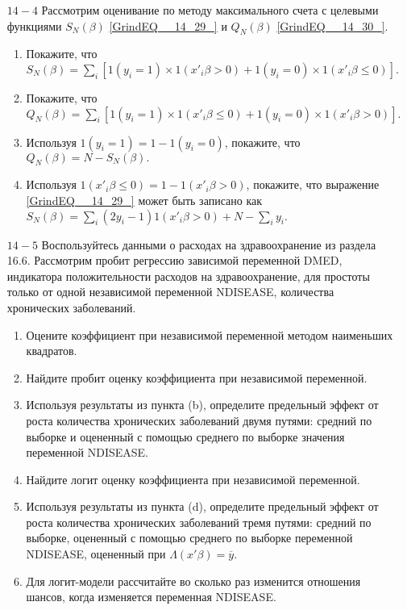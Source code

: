 \begin{enumerate}
\item [$14 - 4$] Рассмотрим оценивание по методу максимального счета с целевыми функциями $S_N(\beta)$ \eqref{GrindEQ__14_29_} и $Q_N(\beta)$ \eqref{GrindEQ__14_30_}.
\begin{enumerate}
\item  Покажите,  что $S_N(\beta) = \sum_i [1(y_i = 1) \times 1(x'_i\beta > 0) + 1(y_i = 0) \times 1(x'_i\beta \le 0)].$
\item  Покажите,  что $Q_N(\beta) = \sum_i [1(y_i = 1) \times 1(x'_i\beta \le 0) + 1(y_i = 0) \times 1(x'_i\beta > 0)].$
\item  Используя $1(y_i = 1) = 1 - 1(y_i = 0)$, покажите, что $Q_N(\beta) = N - S_N(\beta).$
\item  Используя $1(x'_i\beta \le 0) = 1 - 1(x'_i\beta > 0)$, покажите, что выражение \eqref{GrindEQ__14_29_} может быть записано как $S_N(\beta) = \sum_i (2y_i - 1) 1(x'_i\beta > 0) + N - \sum_i y_i.$
\end{enumerate}

\item [$14 - 5$] Воспользуйтесь данными о расходах на здравоохранение из раздела 16.6. Рассмотрим пробит регрессию зависимой переменной DMED, индикатора положительности расходов на здравоохранение,  для простоты только от одной независимой переменной NDISEASE,  количества хронических заболеваний.
\begin{enumerate}
\item  Оцените коэффициент при независимой переменной методом наименьших квадратов.
\item  Найдите пробит оценку коэффициента при независимой переменной.
\item  Используя результаты из пункта (b),  определите предельный эффект от роста количества хронических заболеваний двумя путями: средний по выборке и оцененный с помощью среднего по выборке значения переменной NDISEASE.
\item  Найдите логит оценку коэффициента при независимой переменной.
\item  Используя результаты из пункта (d),  определите предельный эффект от роста количества хронических заболеваний тремя путями: средний по выборке,  оцененный с помощью среднего по выборке переменной NDISEASE,  оцененный при $\Lambda (x'\beta) = \overline{y}.$
\item  Для логит-модели рассчитайте во сколько раз изменится отношения шансов,  когда изменяется переменная NDISEASE.
\end{enumerate}


\end{enumerate}
